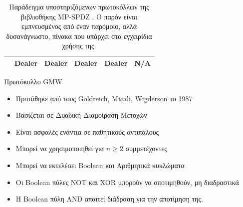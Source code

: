 \documentclass[10pt]{beamer}
\begin{document}
\begin{frame}[fragile,c]{}
\begin{block}{}
\begin{table}[h!]
{\begin{tabular}{|c|l|ll|ll|}
                        & Dealer                                                               & \multicolumn{1}{l|}{Dealer}                      & Dealer                 & \multicolumn{1}{l|}{Dealer}                      & N/A               \\ \hline
                    \end{tabular}
                }
                \caption{Παράδειγμα υποστηριζόμενων πρωτοκόλλων της βιβλιοθήκης MP-SPDZ \cite{mp-spdz}. Ο παρόν είναι εμπνευσμένος από έναν παρόμοιο, αλλά δυσανάγνωστο, πίνακα που υπάρχει στα εγχειρίδια χρήσης της.}
                \label{fig:mp-sdpz-protocols}
            \end{table}
        \end{block}
    \end{frame}
    \begin{frame}{Πρωτόκολλο GMW}
        \begin{block}{}
            \begin{itemize}
                \item Προτάθηκε από τους Goldreich, Micali, Wigderson το 1987
                \item Βασίζεται σε Δυαδική Διαμοίραση Μετοχών
                \item Είναι ασφαλές ενάντια σε παθητικούς αντιπάλους
                \item Μπορεί να χρησιμοποιηθεί για $n \ge 2$ συμμετέχοντες
                \item Μπορεί να εκτελέσει Boolean και Αριθμητικά κυκλώματα
                \item Οι Boolean πύλες NOT και XOR μπορούν να αποτιμηθούν, μη διαδραστικά
                \item Η Boolean πύλη AND απαιτεί διάδραση για την αποτίμηση της.
            \end{itemize}
        \end{block}
    \end{frame}
\end{document}
